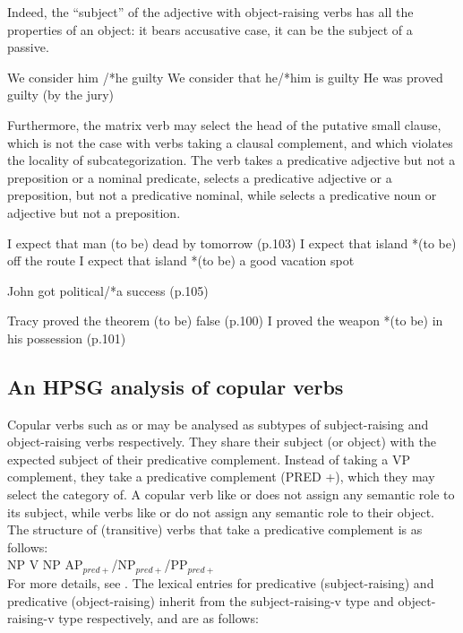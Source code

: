 \documentclass[output=paper]{langsci/langscibook}
\begin{document}
 Indeed, the ``subject'' of the adjective with object-raising verbs has all the properties of an object: it bears accusative case, it can be the subject of a passive.

\begin{exe}
\ex \begin{xlist}
\ex We consider him /*he guilty
\ex 	We consider that he/*him is guilty
\ex 	He was proved guilty (by the jury)	
\end{xlist}
\end{exe}
	

Furthermore, the matrix verb may select the head of the putative small clause, which is not the case with verbs taking a clausal complement, and which violates the locality of subcategorization. The verb takes a predicative adjective but not a preposition or a nominal predicate,  selects a predicative adjective or a preposition, but not a predicative nominal, while  selects a predicative noun or adjective but not a preposition.


\begin{exe}
\ex \begin{xlist}
\ex I expect that man (to be) dead  by tomorrow (p.103)
\ex I expect that island *(to be) off the route
\ex I expect that island *(to be) a good vacation spot
\end{xlist}
\ex John got political/*a success (p.105)	
\ex\begin{xlist}
\ex Tracy proved the theorem (to be) false (p.100)
\ex  I proved the weapon *(to be) in his possession	(p.101)
\end{xlist}

\end{exe}
	


\subsection{An HPSG analysis of copular verbs}
	
Copular verbs such as  or  may be analysed as subtypes of subject-raising and object-raising verbs respectively. They share their subject (or object) with the expected subject of their predicative complement. Instead of taking a VP complement, they take a predicative complement (PRED +), which they may select the category of.
A copular verb like  or  does not assign any semantic role to its subject, while verbs like  or  do not assign any semantic role to their object. The structure of (transitive) verbs that take a predicative complement is as follows:\\ NP V NP AP$_{pred+}$/NP$_{pred+}$/PP$_{pred+}$ \\
For more details, see \cite{PollardandSag1994,VanEynde2015}. 
The lexical entries for predicative (subject-raising)  and predicative (object-raising)  inherit from the subject-raising-v type and object-raising-v type respectively, and are as follows:
\end{document}
